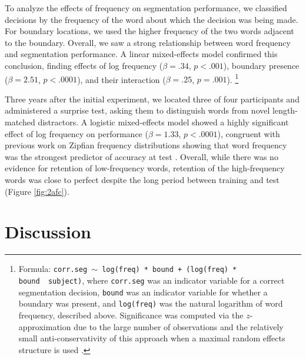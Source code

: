 \documentclass[10pt]{article}
\begin{document}
To analyze the effects of frequency on segmentation performance, we classified decisions by the frequency of the word about which the decision was being made. For boundary locations, we used the higher frequency of the two words adjacent to the boundary. Overall, we saw a strong relationship between word frequency and segmentation performance. A linear mixed-effects model \cite{gelman2006} confirmed this conclusion, finding effects of log frequency ($\beta = .34$, $p < .001$), boundary presence ($\beta = 2.51$, $p < .0001$), and their interaction ($\beta = .25$, $p = .001$). \footnote{Formula: \texttt{corr.seg $\sim$ log(freq) * bound + (log(freq) * bound~\textbar~subject)}, where \texttt{corr.seg} was an indicator variable for a correct segmentation decision, \texttt{bound} was an indicator variable for whether a boundary was present, and \texttt{log(freq)} was the natural logarithm of word frequency, described above. Significance was computed via the $z$-approximation due to the large number of observations and the relatively small anti-conservativity of this approach when a maximal random effects structure is used \cite{barrinpress}.} 




Three years after the initial experiment, we located three of four participants and administered a surprise test, asking them to distinguish words from novel length-matched distractors. A logistic mixed-effects model showed a highly significant effect of log frequency on performance ($\beta = 1.33$, $p < .0001$), congruent with previous work on Zipfian frequency distributions showing that word frequency was the strongest predictor of accuracy at test \cite{kurumada2011}. Overall, while there was no evidence for retention of low-frequency words, retention of the high-frequency words was close to perfect despite the long period between training and test (Figure \ref{fig:2afc}).


\section*{Discussion}
\end{document}

